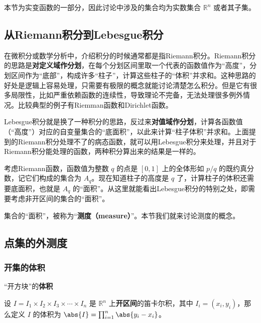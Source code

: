 


本节为实变函数的一部分，因此讨论中涉及的集合均为实数集合 $\mathbb{R}^n$ 或者其子集。


\subsection{从Riemann积分到Lebesgue积分}


在微积分或数学分析中，介绍积分的时候通常都是指Riemann积分。Riemann积分的思路是\textbf{对定义域作分划}，在每个分划区间里取一个代表的函数值作为“高度”，分划区间作为“底部”，构成许多“柱子”，计算这些柱子的“体积”并求和。这种思路的好处是逻辑上容易处理，只需要有极限的概念就能讨论清楚怎么积分。但是它有很多局限性，比如严重依赖函数的连续性，导致理论不完备，无法处理很多例外情况。比较典型的例子有Riemman函数和Dirichlet函数。

Lebesgue积分就是换了一种积分的思路，反过来\textbf{对值域作分划}，计算各函数值（“高度”）对应的自变量集合的“底面积”，以此来计算“柱子体积”并求和。上面提到的Riemann积分处理不了的病态函数，就可以用Lebesgue积分来处理，并且对于Riemann积分能处理的函数，两种积分算出来的结果是一样的。

考虑Riemann函数，函数值为整数 $q$ 的点是 $[0, 1]$ 上的全体形如 $p/q$ 的既约真分数，记它们构成的集合为 $A_q$。现在知道柱子的高度是 $q$ 了，计算柱子的体积还需要底面积，也就是 $A_q$ 的“面积”。从这里就能看出Lebesgue积分的特别之处，即需要考虑非开区间的集合的“面积”。

集合的“面积”，被称为“\textbf{测度（measure）}”。本节我们就来讨论测度的概念。



\subsection{点集的外测度}

\subsubsection{开集的体积}

\begin{definition}{“开方块”的\textbf{体积}}\label{SetMet_def1}

设 $I=I_1\times I_2\times I_3\times\cdots\times I_n$ 是 $\mathbb{R}^n$ 上\textbf{开区间}的笛卡尔积，其中 $I_i=(x_i, y_i)$，那么定义 $I$ 的体积为 $\abs{I} = \prod_{i=1}^n \abs{y_i-x_i}$。

\end{definition}

